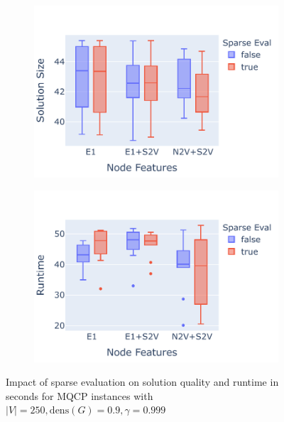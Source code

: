 \documentclass[draft,final]{vutinfth} %
\begin{document}
\begin{figure}
    \centering
    \begin{subfigure}{0.49\textwidth}
        \centering
        \includegraphics[width=\textwidth]{graphics/sparse-eval-1-size.pdf}
    \end{subfigure}
    \begin{subfigure}{0.49\textwidth}
        \centering
        \includegraphics[width=\textwidth]{graphics/sparse-eval-1-runtime.pdf}
    \end{subfigure}
    \caption{Impact of sparse evaluation on solution quality and runtime in seconds for MQCP instances with $|V| = 250, \mathrm{dens}(G)=0.9, \gamma=0.999$}
    \label{fig:sparse-evaluation-1}
\end{figure}
\end{document}

